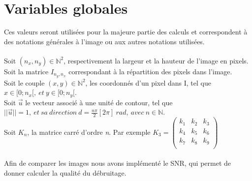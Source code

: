 \documentclass{article}
\newcommand{\N}{\mathbb{N}} %
\begin{document}
	\section{Variables globales}
		Ces valeurs seront utilisées pour la majeure partie des calculs et correspondent à des notations générales à l'image ou aux autres notations utilisées.\\\\
		\noindent
		Soit \begin{math}(n_x, n_y)\in\N^2\end{math}, respectivement la largeur et la hauteur de l'image en pixels.\\
		Soit la matrice \begin{math}I_{n_y, n_x}\end{math} correspondant à la répartition des pixels dans l'image.\\
		Soit le couple \begin{math}(x,y)\in\N^2\end{math}, les coordonnés d'un pixel dans I, tel que \begin{math}x\in[0;n_x[,\ et\ y\in[0;n_y[\end{math}.\\
		Soit \begin{math}\vec{u}\end{math} le vecteur associé à une unité de contour, tel que \begin{math}||\vec{u}|| = 1,\ et\ sa\ direction\ d =\frac{n\pi}{2}[2\pi]\ rad,\ avec\ n\in\N\end{math}.\\
		Soit \begin{math}K_n\end{math}, la matrice carré d'ordre \emph{n}. Par exemple \begin{math}K_3 = \begin{pmatrix}k_1&k_2&k_3\\k_4&k_5&k_6\\k_7&k_8&k_9\\\end{pmatrix}\end{math}\\\\
		Afin de comparer les images nous avons implémenté le SNR, qui permet de donner calculer la qualité du débruitage.
		
\end{document}
